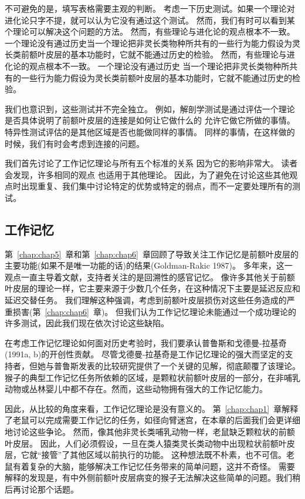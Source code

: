 不可避免的是，填写表格需要主观的判断。
考虑一下历史测试。如果一个理论对进化论只字不提，就可以认为它没有通过这个测试。
然而，我们有时可以看到某个理论可以解决这个问题的方法。 
然而，有些理论与进化论的观点根本不一致。
一个理论没有通过历史当一个理论把非灵长类物种所共有的一些行为能力假设为灵长类前额叶皮层的基本功能时，它就不能通过历史的检验。
然而，有些理论与进化论的观点根本不一致。
一个理论没有通过历史 当一个理论把非灵长类物种所共有的一些行为能力假设为灵长类前额叶皮层的基本功能时，它就不能通过历史的检验。
\par


我们也意识到，这些测试并不完全独立。
例如，解剖学测试是通过评估一个理论是否具体说明了前额叶皮层的连接是如何让它做什么的 允许它做它所做的事情。
特异性测试评估的是其他区域是否也能做同样的事情。
同样的事情，在这样做的时候，我们有时会考虑到连接的问题。
\par


我们首先讨论了工作记忆理论与所有五个标准的关系 因为它的影响非常大。
读者会发现，许多相同的观点 也适用于其他理论。
因此，为了避免在讨论这些其他观点时出现重复、我们集中讨论特定的优势或特定的弱点，而不一定要处理所有的测试。



\subsection{工作记忆}

第~\ref{chap:chap5}~章和第~\ref{chap:chap6}~章回顾了导致关注工作记忆是前额叶皮层的主要功能(如果不是唯一功能的话)的结果(Goldman-Rakic 1987)。
多年来，这一观点一直主导着文献，支持者关注的是回溯性的感官记忆。
像许多其他关于前额叶皮层的理论一样，它主要来源于少数几个任务，在这种情况下主要是延迟反应和延迟交替任务。
我们理解这种强调，考虑到前额叶皮层损伤对这些任务造成的严重损害(第~\ref{chap:chap6}~章)。
但我们认为工作记忆理论未能通过一个成功理论的许多测试，因此我们现在依次讨论这些缺陷。
\par


在考虑工作记忆理论如何面对历史考验时，我们要承认普鲁斯和戈德曼-拉基奇(1991a, b)的开创性贡献。
尽管戈德曼-拉基奇是工作记忆理论的强大而坚定的支持者，但她与普鲁斯发表的比较研究提供了一个关键的见解，彻底颠覆了该理论。
猴子的典型工作记忆任务所依赖的区域，是颗粒状前额叶皮层的一部分，在非哺乳动物或丛林婴儿中都不存在。然而，这些动物拥有强大的工作记忆能力。
\par


因此，从比较的角度来看，工作记忆理论是没有意义的。
第~\ref{chap:chap1}~章解释了老鼠可以完成需要工作记忆的任务，如径向臂迷宫，在本章的后面我们会更详细地讨论这些争论。
然而，像其他非灵长类哺乳动物一样，老鼠缺乏颗粒状的前额叶皮层。
因此，人们必须假设，一旦在类人猿类灵长类动物中出现粒状前额叶皮层，它就“接管”了其他区域以前执行的功能。
这种想法既不朴素，也不可信。老鼠有着复杂的大脑，能够解决工作记忆任务带来的简单问题，这并不奇怪。
需要解释的发现是，有中外侧前额叶皮层病变的猴子无法解决这些简单的问题。我们稍后再讨论那个话题。
\par


